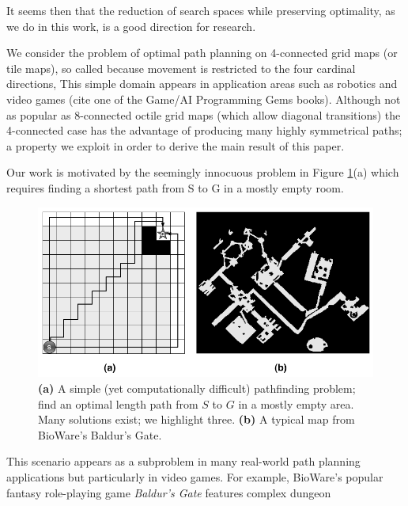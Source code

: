 It seems then that the reduction of search spaces while preserving optimality, as we do in this work, is a good direction for research.
\par
We consider the problem of optimal path planning on 4-connected grid maps (or tile maps), so called because movement is restricted to the four cardinal directions, 
This simple domain appears in application areas such as robotics \cite{latombe91} and video games 
(cite one of the Game/AI Programming Gems books).
Although not as popular as 8-connected octile grid maps (which allow diagonal transitions) the 4-connected case has 
the advantage of producing many highly symmetrical paths; 
a property we exploit in order to derive the main result of this paper.
\par 
Our work is motivated by the seemingly innocuous problem in Figure \ref{fig-emptymap}(a)
which requires finding a shortest path from S to G in a mostly empty room.
\begin{figure}[htbp]
	\vspace{-4pt}
       \begin{center}
                       \includegraphics[scale=0.30, trim = 20mm 20mm 20mm 0mm]{diagrams/emptymap.png}
       \end{center}
	\vspace{-3pt}
       \caption{\textbf{(a)} A simple (yet computationally difficult) pathfinding problem; find an 
optimal length path from $S$ to $G$ in a mostly empty area. 
Many solutions exist; we highlight three. 
\textbf{(b)} A typical map from BioWare's Baldur's Gate.}
       \label{fig-emptymap}
	\vspace{-12pt}
\end{figure}
This scenario appears as a subproblem in many real-world path planning applications but particularly
in video games.
For example, BioWare's popular fantasy role-playing game \emph{Baldur's Gate} features complex dungeon
